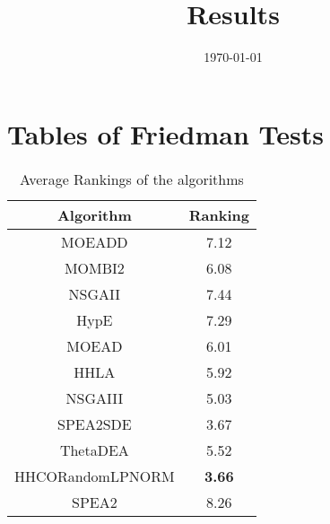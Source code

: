 \documentclass{article}
\title{Results}
\author{}
\date{\today}
\begin{document}
\oddsidemargin 0in \topmargin 0in\maketitle
\section{Tables of Friedman Tests}
\begin{table}[!htp]
\centering
\caption{Average Rankings of the algorithms
}\begin{tabular}{|c|c|}
\hline
Algorithm&Ranking\\
\hline
MOEADD&7.12\\\hline
MOMBI2&6.08\\\hline
NSGAII&7.44\\\hline
HypE&7.29\\\hline
MOEAD&6.01\\\hline
HHLA&5.92\\\hline
NSGAIII&5.03\\\hline
SPEA2SDE&3.67\\\hline
ThetaDEA&5.52\\\hline
HHCORandomLPNORM& {\bf 3.66}\\\hline
SPEA2&8.26\\\hline
\end{tabular}
\end{table}
\end{document}
